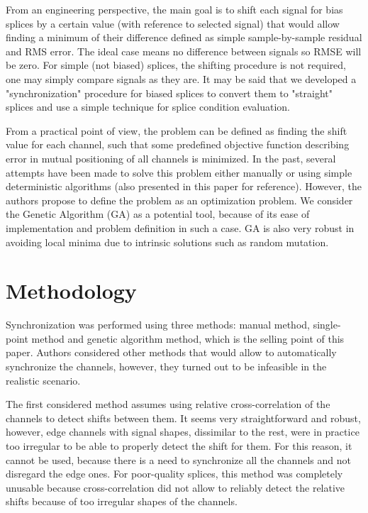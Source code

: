 \documentclass[applsci,article,preprint,moreauthors,pdftex]{Definitions/mdpi}
\begin{document}
From an engineering perspective, the main goal is to shift each signal for bias splices by a certain value (with reference to selected signal) that would allow finding a minimum of their difference defined as simple sample-by-sample residual and RMS error. 
The ideal case means no difference between signals so RMSE will be zero.
For simple (not biased) splices, the shifting procedure is not required, one may simply compare signals as they are. It may be said that we developed a "synchronization" procedure for biased splices to convert them to "straight" splices and use a simple technique for splice condition evaluation.

From a practical point of view, the problem can be defined as finding the shift value for each channel, such that some predefined objective function describing error in mutual positioning of all channels is minimized. In the past, several attempts have been made to solve this problem either manually or using simple deterministic algorithms (also presented in this paper for reference). However, the authors propose to define the problem as an optimization problem. We consider the Genetic Algorithm (GA) as a potential tool, because of its ease of implementation and problem definition in such a case. GA is also very robust in avoiding local minima due to intrinsic solutions such as random mutation.

\section{Methodology}

Synchronization was performed using three methods: manual method, single-point method and genetic algorithm method, which is the selling point of this paper. Authors considered other methods that would allow to automatically synchronize the channels, however, they turned out to be infeasible in the realistic scenario.

The first considered method assumes using relative cross-correlation of the channels to detect shifts between them. It seems very straightforward and robust, however, edge channels with signal shapes, dissimilar to the rest, were in practice too irregular to be able to properly detect the shift for them. For this reason, it cannot be used, because there is a need to synchronize all the channels and not disregard the edge ones. For poor-quality splices, this method was completely unusable because cross-correlation did not allow to reliably detect the relative shifts because of too irregular shapes of the channels.
\end{document}
